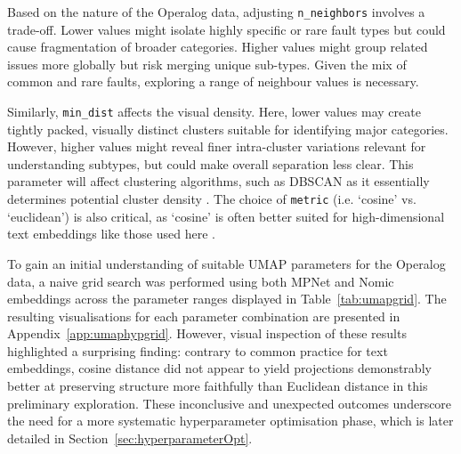 \documentclass[10pt,oneside]{report}
\begin{document}
Based on the nature of the Operalog data, adjusting \texttt{n\_neighbors} involves a trade-off. Lower values might isolate highly specific or rare fault types but could cause fragmentation of broader categories. Higher values might group related issues more globally but risk merging unique sub-types. Given the mix of common and rare faults, exploring a range of neighbour values is necessary. 

Similarly, \texttt{min\_dist} affects the visual density. Here, lower values may create tightly packed, visually distinct clusters suitable for identifying major categories. However, higher values might reveal finer intra-cluster variations relevant for understanding subtypes, but could make overall separation less clear. This parameter will affect clustering algorithms, such as DBSCAN as it essentially determines potential cluster density \cite{ester1996density}.
The choice of \texttt{metric} (i.e. `cosine' vs. `euclidean') is also critical, as `cosine' is often better suited for high-dimensional text embeddings like those used here \cite{baba2017plagiarism, cao2024recent}.

To gain an initial understanding of suitable UMAP parameters for the Operalog data, a naive grid search was performed using both MPNet and Nomic embeddings across the parameter ranges displayed in Table~\ref{tab:umapgrid}. The resulting visualisations for each parameter combination are presented in Appendix~\ref{app:umaphypgrid}. However, visual inspection of these results highlighted a surprising finding: contrary to common practice for text embeddings, cosine distance did not appear to yield projections demonstrably better at preserving structure more faithfully than Euclidean distance in this preliminary exploration. These inconclusive and unexpected outcomes underscore the need for a more systematic hyperparameter optimisation phase, which is later detailed in Section~\ref{sec:hyperparameterOpt}.
\end{document}
